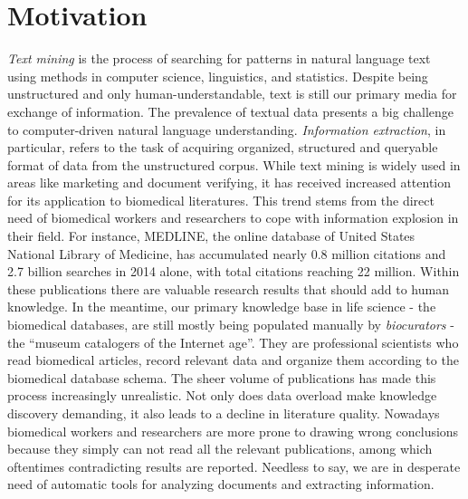 \section{Motivation}\label{section1.1} %
\emph{Text mining} is the process of searching for patterns in natural language text using methods in computer science, linguistics, and statistics. Despite being unstructured and only human-understandable, text is still our primary media for exchange of information\cite{witten2005text}. The prevalence of textual data presents a big challenge to computer-driven natural language understanding. \emph{Information extraction}, in particular, refers to the task of acquiring organized, structured and queryable format of data from the unstructured corpus. \newline\newline
While text mining is widely used in areas like marketing and document verifying, it has received increased attention for its application to biomedical literatures\cite{kim2003genia,ananiadou2006text,krallinger2005text}. This trend stems from the direct need of biomedical workers and researchers to cope with information explosion in their field. For instance, MEDLINE, the online database of United States National Library of Medicine, has accumulated nearly 0.8 million citations and 2.7 billion searches in 2014 alone\cite{MEDLINE:2015:Online}, with total citations reaching 22 million. Within these publications there are valuable research results that should add to human knowledge. In the meantime,  our primary knowledge base in life science - the biomedical databases, are still mostly being populated manually by \emph{biocurators} - the ``museum catalogers of the Internet age''\cite{wiki:biocurators}. They are professional scientists who read biomedical articles, record relevant data and organize them according to the biomedical database schema. The sheer volume of publications has made this process increasingly unrealistic\cite{cohen2005survey}.\newline\newline
Not only does data overload make knowledge discovery demanding, it also leads to a decline in literature quality. Nowadays biomedical workers and researchers are more prone to drawing wrong conclusions because they simply can not read all the relevant publications, among which oftentimes contradicting results are reported. Needless to say, we are in desperate need of automatic tools for analyzing documents and extracting information.

